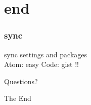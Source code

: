 \documentclass{beamer}
\begin{document}
\begin{frame}
\frametitle{}
\end{frame}


\section{end}
\begin{frame}
\frametitle{sync}
sync settings and packages\\
Atom: easy
Code: gist !!
\end{frame}

\begin{frame}
\Huge{\centerline{Questions?}}
\end{frame}

\begin{frame}
\Huge{\centerline{The End}}
\end{frame}
\end{document}
